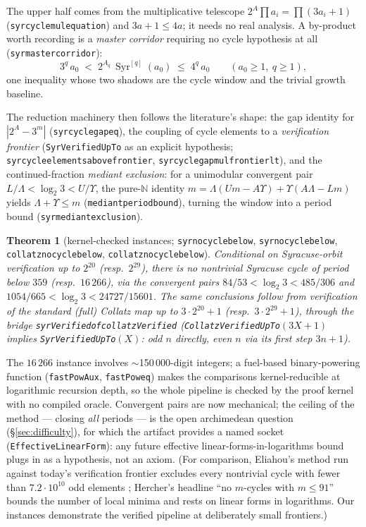 \documentclass[11pt]{amsart}
\newtheorem{theorem}{Theorem}[section]
\theoremstyle{definition}
\theoremstyle{remark}
\newcommand{\Syr}{\operatorname{Syr}}
\newcommand{\lean}[1]{{\def\_{\textunderscore\allowbreak}\texttt{#1}}}
\newcommand{\N}{\mathbb{N}}
\begin{document}
The upper half comes from the multiplicative telescope
$2^{A}\prod a_i = \prod(3a_i+1)$ (\lean{syr\_cycle\_mul\_equation}) and
$3a+1 \le 4a$; it needs no real analysis.  A by-product worth recording is a
\emph{master corridor} requiring no cycle hypothesis at all
(\lean{syr\_master\_corridor}):
\[
3^q\,a_0 \;<\; 2^{A_q}\,\Syr^{[q]}(a_0) \;\le\; 4^q\,a_0
\qquad (a_0 \ge 1,\ q \ge 1),
\]
one inequality whose two shadows are the cycle window and the trivial growth
baseline.

The reduction machinery then follows the literature's shape: the gap
identity for $|2^A - 3^m|$ (\lean{syr\_cycle\_gap\_eq}), the coupling of
cycle elements to a \emph{verification frontier} (\lean{SyrVerifiedUpTo} as
an explicit hypothesis; \lean{syr\_cycle\_elements\_above\_frontier},
\lean{syr\_cycle\_gap\_mul\_frontier\_lt}), and the continued-fraction
\emph{mediant exclusion}: for a unimodular convergent pair
$L/\Lambda < \log_2 3 < U/\Upsilon$, the pure-$\N$ identity
$m = \Lambda(U m - A\Upsilon) + \Upsilon(A\Lambda - L m)$ yields
$\Lambda + \Upsilon \le m$ (\lean{mediant\_period\_bound}), turning the
window into a period bound (\lean{syr\_mediant\_exclusion}).

\begin{theorem}[kernel-checked instances;
\lean{syr\_no\_cycle\_below\_359}, \lean{syr\_no\_cycle\_below\_16266},
\lean{collatz\_no\_cycle\_below\_359}, \lean{collatz\_no\_cycle\_below\_16266}]
\label{thm:cycle-instances}
Conditional on Syracuse-orbit verification up to $2^{20}$ (resp.\
$2^{29}$), there is no nontrivial Syracuse cycle of period below $359$
(resp.\ $16\,266$), via the convergent pairs $84/53 < \log_2 3 < 485/306$
and $1054/665 < \log_2 3 < 24727/15601$.  The same conclusions follow from
verification of the standard (full) Collatz map up to $3\cdot 2^{20}+1$
(resp.\ $3\cdot 2^{29}+1$), through the bridge
\lean{syrVerified\_of\_collatzVerified} (\lean{CollatzVerifiedUpTo}$(3X+1)$
implies \lean{SyrVerifiedUpTo}$(X)$: odd $n$ directly, even $n$ via its
first step $3n+1$).
\end{theorem}

The $16\,266$ instance involves $\sim$150\,000-digit integers; a fuel-based
binary-powering function (\lean{fastPowAux}, \lean{fastPow\_eq}) makes the
comparisons kernel-reducible at logarithmic recursion depth, so the whole
pipeline is checked by the proof kernel with no compiled oracle.  Convergent
pairs are now mechanical; the ceiling of the method --- closing \emph{all}
periods --- is the open archimedean question (\S\ref{sec:difficulty}), for
which the artifact provides a named socket (\lean{EffectiveLinearForm}): any
future effective linear-forms-in-logarithms bound plugs in as a hypothesis,
not an axiom.  (For comparison, Eliahou's method run against today's
verification frontier excludes every nontrivial cycle with fewer than
$7.2\cdot10^{10}$ odd elements \cite[\S1]{Hercher2023}; Hercher's headline
``no $m$-cycles with $m \le 91$'' bounds the number of local minima and rests
on linear forms in logarithms.  Our instances demonstrate the verified
pipeline at deliberately small frontiers.)
\end{document}
